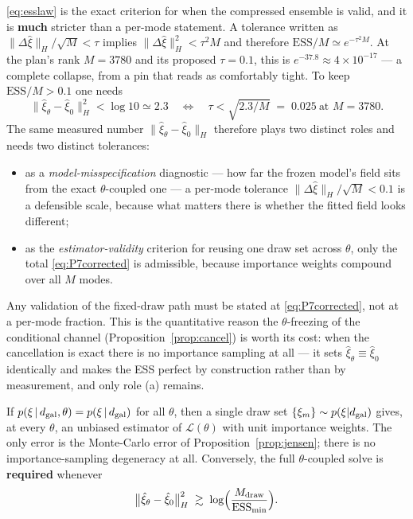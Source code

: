 \begin{remark}
\label{rem:P7}
\eqref{eq:esslaw} is the exact criterion for when the compressed ensemble is
valid, and it is \textbf{much} stricter than a per-mode statement.  A tolerance
written as $\|\Delta\hat\xi\|_H/\sqrt M<\tau$ implies
$\|\Delta\hat\xi\|_H^2<\tau^2M$ and therefore
$\mathrm{ESS}/M\simeq e^{-\tau^2M}$.  At the plan's rank $M=3780$ and its
proposed $\tau=0.1$, this is $e^{-37.8}\approx4\times10^{-17}$ --- a complete
collapse, from a pin that reads as comfortably tight.  To keep
$\mathrm{ESS}/M>0.1$ one needs
\begin{equation}
  \big\|\hat\xi_\theta-\hat\xi_0\big\|_H^2<\log 10\simeq2.3
  \quad\Longleftrightarrow\quad
  \tau<\sqrt{2.3/M}\;=\;0.025\ \text{at }M=3780 .
  \label{eq:P7corrected}
\end{equation}
The same measured number $\|\hat\xi_\theta-\hat\xi_0\|_H$ therefore plays two
distinct roles and needs two distinct tolerances:
\begin{itemize}
\item[(a)] as a \emph{model-misspecification} diagnostic --- how far the frozen
model's field sits from the exact $\theta$-coupled one --- a per-mode
tolerance $\|\Delta\hat\xi\|_H/\sqrt M<0.1$ is a defensible scale, because what
matters there is whether the fitted field looks different;
\item[(b)] as the \emph{estimator-validity} criterion for reusing one draw set
across $\theta$, only the total \eqref{eq:P7corrected} is admissible, because
importance weights compound over all $M$ modes.
\end{itemize}
Any validation of the fixed-draw path must be stated at
\eqref{eq:P7corrected}, not at a per-mode fraction.  This is the quantitative
reason the $\theta$-freezing of the conditional channel
(Proposition~\ref{prop:cancel}) is worth its cost: when the cancellation is
exact there is no importance sampling at all --- it sets
$\hat\xi_\theta\equiv\hat\xi_0$ identically and makes the ESS perfect by
construction rather than by measurement, and only role (a) remains.
\end{remark}

\begin{proposition}
\label{prop:compressexact}
If $p(\xi\,|\,d_{\rm gal},\theta)=p(\xi\,|\,d_{\rm gal})$ for all $\theta$,
then a single draw set $\{\xi_m\}\sim p(\xi|d_{\rm gal})$ gives, at every
$\theta$, an unbiased estimator of $\mathcal L(\theta)$ with unit importance
weights.  The only error is the Monte-Carlo error of
Proposition~\ref{prop:jensen}; there is no importance-sampling degeneracy at
all.  Conversely, the full $\theta$-coupled solve is \textbf{required} whenever
\begin{equation}
  \big\|\hat\xi_\theta-\hat\xi_0\big\|_H^2
  \;\gtrsim\;\log\!\Big(\frac{M_{\rm draw}}{\mathrm{ESS}_{\min}}\Big).
  \label{eq:requirefullsolve}
\end{equation}
\end{proposition}

